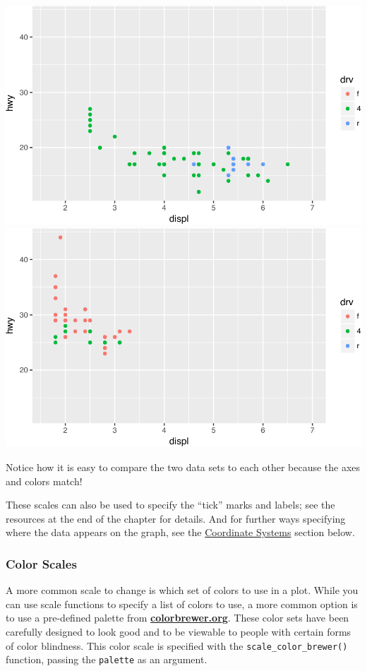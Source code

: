 \documentclass[]{book}
\theoremstyle{definition}
\theoremstyle{definition}
\theoremstyle{remark}
\begin{document}
\includegraphics[width=380pt]{img/ggplot2/scale_limit-1}
\includegraphics[width=380pt]{img/ggplot2/scale_limit-2}

Notice how it is easy to compare the two data sets to each other because
the axes and colors match!

These scales can also be used to specify the ``tick'' marks and labels;
see the resources at the end of the chapter for details. And for further
ways specifying where the data appears on the graph, see the
\protect\hyperlink{coordinate-systems}{Coordinate Systems} section
below.

\subsubsection{Color Scales}\label{color-scales}

A more common scale to change is which set of colors to use in a plot.
While you can use scale functions to specify a list of colors to use, a
more common option is to use a pre-defined palette from
\href{http://colorbrewer2.org/}{\textbf{colorbrewer.org}}. These color
sets have been carefully designed to look good and to be viewable to
people with certain forms of color blindness. This color scale is
specified with the \texttt{scale\_color\_brewer()} function, passing the
\texttt{palette} as an argument.
\end{document}
